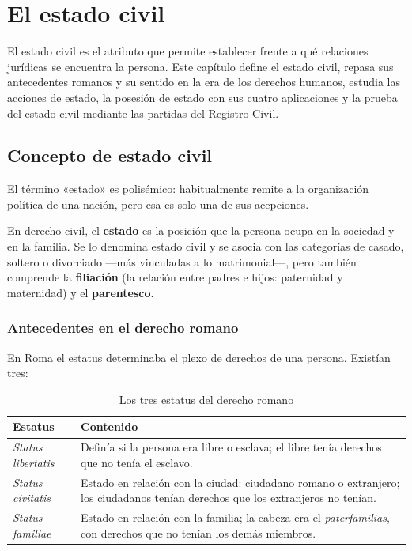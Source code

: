 \documentclass[12pt,oneside]{book}
\begin{document}
\chapter{El estado civil}
\label{cap:estado}

El estado civil es el atributo que permite establecer frente a qué relaciones jurídicas se encuentra la persona. Este capítulo define el estado civil, repasa sus antecedentes romanos y su sentido en la era de los derechos humanos, estudia las acciones de estado, la posesión de estado con sus cuatro aplicaciones y la prueba del estado civil mediante las partidas del Registro Civil.

\section{Concepto de estado civil}

El término «estado» es polisémico: habitualmente remite a la organización política de una nación, pero esa es solo una de sus acepciones.

\begin{definicion}
En derecho civil, el \textbf{estado} es la posición que la persona ocupa en la sociedad y en la familia. Se lo denomina estado civil y se asocia con las categorías de casado, soltero o divorciado ---más vinculadas a lo matrimonial---, pero también comprende la \textbf{filiación} (la relación entre padres e hijos: paternidad y maternidad) y el \textbf{parentesco}.
\end{definicion}

\subsection{Antecedentes en el derecho romano}

En Roma el estatus determinaba el plexo de derechos de una persona. Existían tres:

\begin{table}[H]
\centering
\begin{tabularx}{\textwidth}{B{0.22\textwidth} Y}
\toprule
\textbf{Estatus} & \textbf{Contenido} \\
\midrule
\textit{Status libertatis} & Definía si la persona era libre o esclava; el libre tenía derechos que no tenía el esclavo. \\
\textit{Status civitatis} & Estado en relación con la ciudad: ciudadano romano o extranjero; los ciudadanos tenían derechos que los extranjeros no tenían. \\
\textit{Status familiae} & Estado en relación con la familia; la cabeza era el \textit{paterfamilias}, con derechos que no tenían los demás miembros. \\
\bottomrule
\end{tabularx}
\caption{Los tres estatus del derecho romano}
\end{table}
\end{document}
